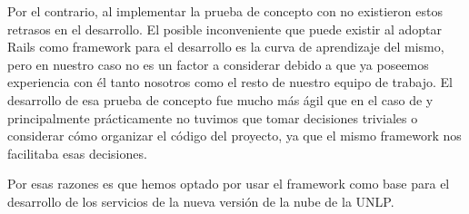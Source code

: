 Por el contrario, al implementar la prueba de concepto con  no existieron estos retrasos en el desarrollo. El posible inconveniente que puede existir al adoptar Rails como framework para el desarrollo es la curva de aprendizaje del mismo, pero en nuestro caso no es un factor a considerar debido a que ya poseemos experiencia con él tanto nosotros como el resto de nuestro equipo de trabajo. El desarrollo de esa prueba de concepto fue mucho más ágil que en el caso de  y principalmente prácticamente no tuvimos que tomar decisiones triviales o considerar cómo organizar el código del proyecto, ya que el mismo framework nos facilitaba esas decisiones.

Por esas razones es que hemos optado por usar el framework  como base para el desarrollo de los servicios de la nueva versión de la nube de la UNLP.
